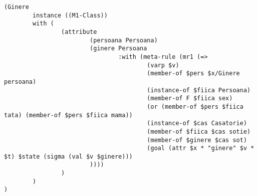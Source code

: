 \documentclass{article}
\begin{document}
{\begin{verbatim}
(Ginere
        instance ((M1-Class))
        with (
                (attribute
                        (persoana Persoana)
                        (ginere Persoana
                                :with (meta-rule (mr1 (=>
                                        (varp $v)
                                        (member-of $pers $x/Ginere persoana)
                                        (instance-of $fiica Persoana)
                                        (member-of F $fiica sex)
                                        (or (member-of $pers $fiica tata) (member-of $pers $fiica mama))
                                        (instance-of $cas Casatorie)
                                        (member-of $fiica $cas sotie)
                                        (member-of $ginere $cas sot)
                                        (goal (attr $x * "ginere" $v * $t) $state (sigma (val $v $ginere)))
                        ))))
                )
        )
)
\end{verbatim}
}
\end{document}
